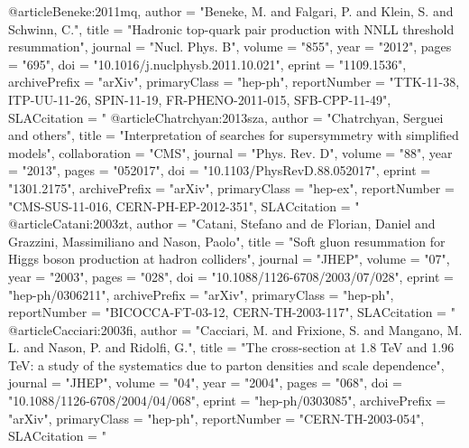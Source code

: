 @article{Beneke:2011mq,
      author         = "Beneke, M. and Falgari, P. and Klein, S. and Schwinn, C.",
      title          = "{Hadronic top-quark pair production with NNLL threshold
                        resummation}",
      journal        = "Nucl. Phys. B",
      volume         = "855",
      year           = "2012",
      pages          = "695",
      doi            = "10.1016/j.nuclphysb.2011.10.021",
      eprint         = "1109.1536",
      archivePrefix  = "arXiv",
      primaryClass   = "hep-ph",
      reportNumber   = "TTK-11-38, ITP-UU-11-26, SPIN-11-19, FR-PHENO-2011-015,
                        SFB-CPP-11-49",
      SLACcitation   = "%
}
@article{Chatrchyan:2013sza,
      author         = "Chatrchyan, Serguei and others",
      title          = "{Interpretation of searches for supersymmetry with
                        simplified models}",
      collaboration  = "CMS",
      journal        = "Phys. Rev. D",
      volume         = "88",
      year           = "2013",
      pages          = "052017",
      doi            = "10.1103/PhysRevD.88.052017",
      eprint         = "1301.2175",
      archivePrefix  = "arXiv",
      primaryClass   = "hep-ex",
      reportNumber   = "CMS-SUS-11-016, CERN-PH-EP-2012-351",
      SLACcitation   = "%
}
@article{Catani:2003zt,
      author         = "Catani, Stefano and de Florian, Daniel and Grazzini,
                        Massimiliano and Nason, Paolo",
      title          = "{Soft gluon resummation for Higgs boson production at
                        hadron colliders}",
      journal        = "JHEP",
      volume         = "07",
      year           = "2003",
      pages          = "028",
      doi            = "10.1088/1126-6708/2003/07/028",
      eprint         = "hep-ph/0306211",
      archivePrefix  = "arXiv",
      primaryClass   = "hep-ph",
      reportNumber   = "BICOCCA-FT-03-12, CERN-TH-2003-117",
      SLACcitation   = "%
}
@article{Cacciari:2003fi,
      author         = "Cacciari, M. and Frixione, S. and Mangano, M. L. and
                        Nason, P. and Ridolfi, G.",
      title          = "{The \ttbar cross-section at 1.8 TeV and 1.96 TeV: a
                        study of the systematics due to parton densities and scale
                        dependence}",
      journal        = "JHEP",
      volume         = "04",
      year           = "2004",
      pages          = "068",
      doi            = "10.1088/1126-6708/2004/04/068",
      eprint         = "hep-ph/0303085",
      archivePrefix  = "arXiv",
      primaryClass   = "hep-ph",
      reportNumber   = "CERN-TH-2003-054",
      SLACcitation   = "%
}
